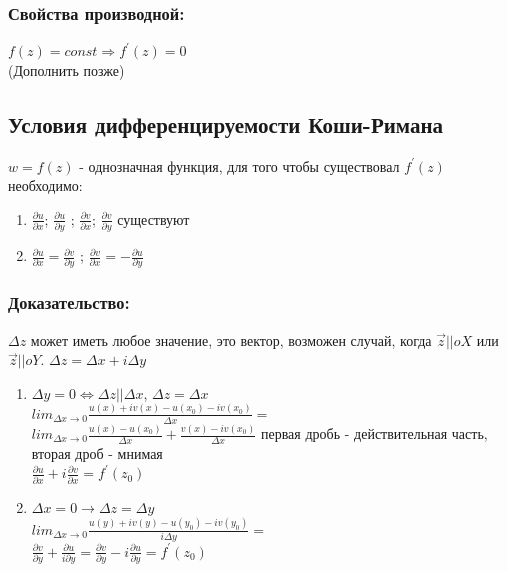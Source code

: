 \documentclass{article}
\begin{document}
            \subsubsection*{Свойства производной:}
            $f(z)=const \Rightarrow f^{\prime}(z)=0$\\
            (Дополнить позже)
            \newpage
            \subsection{Условия дифференцируемости Коши-Римана}
            \footnotemark {}
            $w=f(z)$ - однозначная функция, для того чтобы существовал $f^{\prime}(z)$ необходимо:
            \begin{enumerate}
              \item $\frac{\partial u}{\partial x}$;  $\frac{\partial u}{\partial y}$ ;  $\frac{\partial v}{\partial x}$;  $\frac{\partial v}{\partial y}$  существуют
              \item $\frac{\partial u}{\partial x} = \frac{\partial v}{\partial y}$ ; $\frac{\partial v}{\partial x} = - \frac{\partial u}{\partial y}$
            \end{enumerate}
            \subsubsection*{Доказательство:}
            $\Delta z$ может иметь любое значение, это вектор, возможен случай, когда $\vec{z} || oX$ или $\vec{z} || oY$. $\Delta z= \Delta x +i \Delta y $
            \begin{enumerate}
              \item $\Delta y=0 \Leftrightarrow \Delta z || \Delta x$, $\Delta z = \Delta x$\\
              $lim_{\Delta x \rightarrow 0} \frac{u(x)+iv(x)-u(x_{0})-iv(x_{0})}{\Delta x}=$\\
            $lim_{\Delta x \rightarrow 0} \frac{u(x)-u(x_{0})}{\Delta x}+\frac{v(x)-iv(x_{0})}{\Delta x}$ первая дробь - действительная часть, вторая дроб - мнимая\\
            $\frac{\partial u}{\partial x} +i \frac{\partial v}{\partial x}=f^{\prime}(z_{0})$
            \item $\Delta x=0 \rightarrow \Delta z = \Delta y$\\
            $lim_{\Delta x \rightarrow 0} \frac{u(y)+iv(y)-u(y_{0})-iv(y_{0})}{i \Delta y}=$\\
            $\frac{\partial v}{\partial y} + \frac{\partial u}{i \partial y}=\frac{\partial v}{\partial y} - i \frac{\partial u}{\partial y}=f^{\prime}(z_{0})$
            \end{enumerate}
\end{document}
